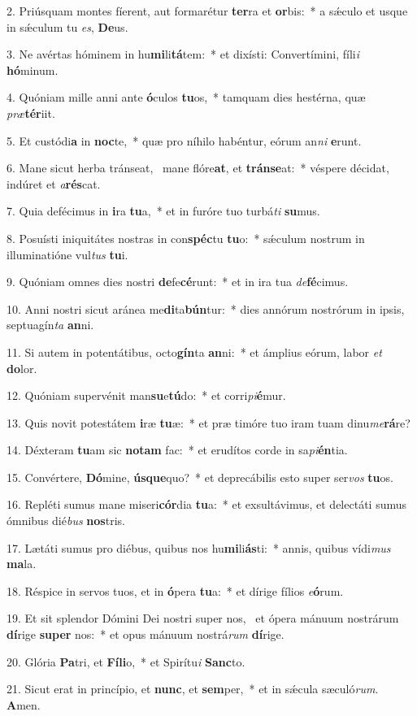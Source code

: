 2. Priúsquam montes fíerent, aut formarétur \textbf{ter}ra et \textbf{or}bis:~*  a sǽculo et usque in sǽculum tu \textit{es}, \textbf{De}us.\

3. Ne avértas hóminem in hu\textbf{mi}li\textbf{tá}tem:~*  et dixísti: Convertímini, fíli\textit{i} \textbf{hó}minum.\

4. Quóniam mille anni ante \textbf{ó}culos \textbf{tu}os,~*  tamquam dies hestérna, quæ \textit{præ}\textbf{tér}iit.\

5. Et custódi\textbf{a} in \textbf{noc}te,~*  quæ pro níhilo habéntur, eórum an\textit{ni} \textbf{e}runt.\

6. Mane sicut herba tránseat, \dag\  mane flóre\textbf{at}, et \textbf{tráns}\textbf{e}at:~*  véspere décidat, indúret et \textit{a}\textbf{rés}cat.\

7. Quia defécimus in \textbf{i}ra \textbf{tu}a,~*  et in furóre tuo turbá\textit{ti} \textbf{su}mus.\

8. Posuísti iniquitátes nostras in con\textbf{spéc}tu \textbf{tu}o:~*  sǽculum nostrum in illuminatióne vul\textit{tus} \textbf{tu}i.\

9. Quóniam omnes dies nostri \textbf{de}fe\textbf{cé}runt:~*  et in ira tua \textit{de}\textbf{fé}cimus.\

10. Anni nostri sicut aránea me\textbf{di}ta\textbf{bún}tur:~*  dies annórum nostrórum in ipsis, septuagín\textit{ta} \textbf{an}ni.\

11. Si autem in potentátibus, octo\textbf{gín}ta \textbf{an}ni:~*  et ámplius eórum, labor \textit{et} \textbf{do}lor.\

12. Quóniam supervénit man\textbf{su}e\textbf{tú}do:~*  et corri\textit{pi}\textbf{é}mur.\

13. Quis novit potestátem \textbf{i}ræ \textbf{tu}æ:~*  et præ timóre tuo iram tuam dinu\textit{me}\textbf{rá}re?\

14. Déxteram \textbf{tu}am sic \textbf{no}\textbf{tam} fac:~*  et erudítos corde in sa\textit{pi}\textbf{én}tia.\

15. Convértere, \textbf{Dó}mine, \textbf{ús}\textbf{que}quo?~*  et deprecábilis esto super ser\textit{vos} \textbf{tu}os.\

16. Repléti sumus mane miseri\textbf{cór}dia \textbf{tu}a:~*  et exsultávimus, et delectáti sumus ómnibus dié\textit{bus} \textbf{nos}tris.\

17. Lætáti sumus pro diébus, quibus nos hu\textbf{mi}li\textbf{ás}ti:~*  annis, quibus vídi\textit{mus} \textbf{ma}la.\

18. Réspice in servos tuos, et in \textbf{ó}pera \textbf{tu}a:~*  et dírige fílios \textit{e}\textbf{ó}rum.\

19. Et sit splendor Dómini Dei nostri super nos, \dag\  et ópera mánuum nostrárum \textbf{dí}rige \textbf{su}\textbf{per} nos:~*  et opus mánuum nostrá\textit{rum} \textbf{dí}rige.\

20. Glória \textbf{Pa}tri, et \textbf{Fí}\textbf{li}o,~*  et Spirítu\textit{i} \textbf{Sanc}to.\

21. Sicut erat in princípio, et \textbf{nunc}, et \textbf{sem}per,~*  et in sǽcula sæculó\textit{rum}. \textbf{A}men.\

